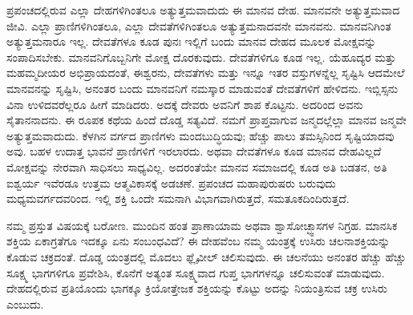 \vskip 0.3cm

ಪ್ರಪಂಚದಲ್ಲಿರುವ ಎಲ್ಲಾ ದೇಹಗಳಿಗಿಂತಲೂ ಅತ್ಯುತ್ತಮವಾದುದು ಈ ಮಾನವ ದೇಹ. ಮಾನವನೇ ಅತ್ಯುತ್ತಮವಾದ ಜೀವಿ. ಎಲ್ಲಾ ಪ್ರಾಣಿಗಳಿಗಿಂತಲೂ, ಎಲ್ಲಾ ದೇವತೆಗಳಿಗಿಂತಲೂ ಅತ್ಯುತ್ತಮನಾದವನೇ ಮಾನವನು. ಮಾನವನಿಗಿಂತ ಅತ್ಯುತ್ತಮನಾರೂ ಇಲ್ಲ. ದೇವತೆಗಳೂ ಕೂಡ ಪುನಃ ಇಲ್ಲಿಗೆ ಬಂದು ಮಾನವ ದೇಹದ ಮೂಲಕ ಮೋಕ್ಷವನ್ನು ಸಂಪಾದಿಸಬೇಕು. ಮಾನವನಿಗೊಬ್ಬನಿಗೇ ಮೋಕ್ಷ ದೊರಕುವುದು. ದೇವತೆಗಳಿಗೂ ಕೂಡ ಇಲ್ಲ. ಯೆಹೂದ್ಯರ ಮತ್ತು ಮಹಮ್ಮದೀಯರ ಅಭಿಪ್ರಾಯದಂತೆ, ಈಶ್ವರನು, ದೇವತೆಗಳು ಮತ್ತು ಇನ್ನೂ ಇತರ ವಸ್ತುಗಳನ್ನೆಲ್ಲ ಸೃಷ್ಟಿಸಿ ಆದಮೇಲೆ ಮಾನವನನ್ನು ಸೃಷ್ಟಿಸಿ, ಅನಂತರ ಬಂದು ಮಾನವನಿಗೆ ನಮಸ್ಕಾರ ಮಾಡುವಂತೆ ದೇವತೆಗಳಿಗೆ ಹೇಳಿದನು. ಇಬ್ಲಿಸ್ಸನು ವಿನಾ ಉಳಿದವರೆಲ್ಲರೂ ಹೀಗೆ ಮಾಡಿದರು. ಅದಕ್ಕೆ ದೇವರು ಅವನಿಗೆ ಶಾಪ ಕೊಟ್ಟನು. ಅದರಿಂದ ಅವನು ಸೈತಾನನಾದನು. ಈ ರೂಪಕ ಕಥೆಯ ಹಿಂದೆ ದೊಡ್ಡ ಸತ್ಯವಿದೆ. ನಮಗೆ ಪ್ರಾಪ್ತವಾಗುವ ಜನ್ಮದಲ್ಲೆಲ್ಲಾ ಮಾನವ ಜನ್ಮವೇ ಅತ್ಯುತ್ತಮವಾದುದು. ಕೆಳಗಿನ ವರ್ಗದ ಪ್ರಾಣಿಗಳು ಮಂದಬುದ್ಧಿಯವು; ಹೆಚ್ಚು ಪಾಲು ತಮಸ್ಸಿನಿಂದ ಸೃಷ್ಟಿಯಾದವು ಅವು. ಬಹಳ ಉದಾತ್ತ ಭಾವನೆ ಪ್ರಾಣಿಗಳಿಗೆ ಇರಲಾರದು. ಅಥವಾ ದೇವತೆಗಳೂ ಕೂಡ ಮಾನವ ದೇಹವಿಲ್ಲದೆ ಮೋಕ್ಷವನ್ನು ನೇರವಾಗಿ ಸಾಧಿಸಲು ಸಾಧ್ಯವಿಲ್ಲ. ಅದರಂತೆಯೇ ಮಾನವ ಸಮಾಜದಲ್ಲಿ ಕೂಡ ಅತಿ ಬಡತನ, ಅತಿ ಐಶ್ವರ್ಯ ಇವೆರಡೂ ಉತ್ತಮ ಆತ್ಮವಿಕಾಸಕ್ಕೆ ಅಡಚಣೆ. ಪ್ರಪಂಚದ ಮಹಾಪುರುಷರು ಬರುವುದು ಮಧ್ಯಮವರ್ಗದವರಿಂದ. ಇಲ್ಲಿ ಶಕ್ತಿ ಒಂದೇ ಸಮನಾಗಿ ವಿಭಾಗವಾಗಿರುತ್ತದೆ, ಸಮತೂಕದಿಂದಿರುತ್ತದೆ. 

\vskip 0.3cm

ನಮ್ಮ ಪ್ರಸ್ತುತ ವಿಷಯಕ್ಕೆ ಬರೋಣ. ಮುಂದಿನ ಹಂತ ಪ್ರಾಣಾಯಾಮ ಅಥವಾ ಶ್ವಾಸೋಚ್ಛ್ವಾಸಗಳ ನಿಗ್ರಹ. ಮಾನಸಿಕ ಶಕ್ತಿಯ ಏಕಾಗ್ರತೆಗೂ ಇದಕ್ಕೂ ಏನು ಸಂಬಂಧವಿದೆ? ಈ ದೇಹವೆಂಬ ನಮ್ಮ ಯಂತ್ರಕ್ಕೆ ಉಸಿರು ಚಲನಾಶಕ್ತಿಯನ್ನು ಕೊಡುವ ಚಕ್ರದಂತೆ. ದೊಡ್ಡ ಯಂತ್ರದಲ್ಲಿ ಮೊದಲು ಫ್ಲೈವೀಲ್​ ಚಲಿಸುವುದು. ಈ ಚಲನೆಯು ಅನಂತರ ಹೆಚ್ಚು ಹೆಚ್ಚು ಸೂಕ್ಷ್ಮ ಭಾಗಗಳಿಗೂ ಪ್ರವೇಶಿಸಿ, ಕೊನೆಗೆ ಅತ್ಯಂತ ಸೂಕ್ಷ್ಮವಾದ ಗುಪ್ತ ಭಾಗಗಳನ್ನೂ ಚಲಿಸುವಂತೆ ಮಾಡುವುದು. ದೇಹದಲ್ಲಿರುವ ಪ್ರತಿಯೊಂದು ಭಾಗಕ್ಕೂ ಕ್ರಿಯೋತ್ತೇಜಕ ಶಕ್ತಿಯನ್ನು ಕೊಟ್ಟು ಅದನ್ನು ನಿಯಂತ್ರಿಸುವ ಚಕ್ರ ಉಸಿರು ಎಂಬುದು. 

